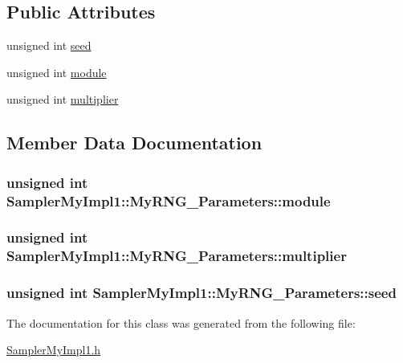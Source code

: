 \subsection*{Public Attributes}
\begin{DoxyCompactItemize}
\item 
unsigned int \hyperlink{class_sampler_my_impl1_1_1_my_r_n_g___parameters_a4fd3cd31977ef5d606d31d2d68def258}{seed}
\item 
unsigned int \hyperlink{class_sampler_my_impl1_1_1_my_r_n_g___parameters_a7e4c25cb935ac5ecd7732028dbe4541f}{module}
\item 
unsigned int \hyperlink{class_sampler_my_impl1_1_1_my_r_n_g___parameters_a5038aa739c1c072931154d7d8c1a8cb0}{multiplier}
\end{DoxyCompactItemize}


\subsection{Member Data Documentation}
\hypertarget{class_sampler_my_impl1_1_1_my_r_n_g___parameters_a7e4c25cb935ac5ecd7732028dbe4541f}{
\subsubsection[{module}]{\setlength{\rightskip}{0pt plus 5cm}unsigned int Sampler\-My\-Impl1\-::\-My\-R\-N\-G\-\_\-\-Parameters\-::module}}\label{class_sampler_my_impl1_1_1_my_r_n_g___parameters_a7e4c25cb935ac5ecd7732028dbe4541f}
\hypertarget{class_sampler_my_impl1_1_1_my_r_n_g___parameters_a5038aa739c1c072931154d7d8c1a8cb0}{
\subsubsection[{multiplier}]{\setlength{\rightskip}{0pt plus 5cm}unsigned int Sampler\-My\-Impl1\-::\-My\-R\-N\-G\-\_\-\-Parameters\-::multiplier}}\label{class_sampler_my_impl1_1_1_my_r_n_g___parameters_a5038aa739c1c072931154d7d8c1a8cb0}
\hypertarget{class_sampler_my_impl1_1_1_my_r_n_g___parameters_a4fd3cd31977ef5d606d31d2d68def258}{
\subsubsection[{seed}]{\setlength{\rightskip}{0pt plus 5cm}unsigned int Sampler\-My\-Impl1\-::\-My\-R\-N\-G\-\_\-\-Parameters\-::seed}}\label{class_sampler_my_impl1_1_1_my_r_n_g___parameters_a4fd3cd31977ef5d606d31d2d68def258}


The documentation for this class was generated from the following file\-:\begin{DoxyCompactItemize}
\item 
\hyperlink{_sampler_my_impl1_8h}{Sampler\-My\-Impl1.\-h}\end{DoxyCompactItemize}
